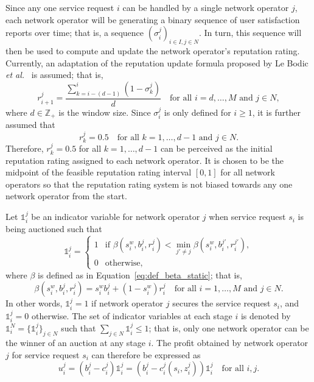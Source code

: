 Since any one service request $i$ can be handled by a single network operator $j$, each network operator will be generating a binary sequence of user satisfaction reports over time; that is, a sequence $(\sigma^j_i)_{i\in I,j\in N}$. In turn, this sequence will then be used to compute and update the network operator's reputation rating. Currently, an adaptation of the reputation update formula proposed by Le Bodic \emph{et al.}~\cite{DMLeBodic00} is assumed; that is,
\begin{equation}
  \label{eq:def_rep_update_lebodic_dynamic}
  r^j_{i+1} = \frac{\displaystyle\sum_{k=i-(d-1)}^{i}{(1-\sigma^j_k)}}{d} \quad\text{for all }i=d,\ldots,M \text{ and }j\in N,
\end{equation}
where $d\in \mathbb{Z}_+$ is the window size. Since $\sigma^j_i$ is only defined for $i\ge 1$, it is further assumed that
\begin{equation*}
  r^j_k = 0.5 \quad\text{for all }k=1,\ldots,d-1\text{ and }j\in N.
\end{equation*}
Therefore, $r^j_k=0.5$ for all $k=1,\ldots,d-1$ can be perceived as the initial reputation rating assigned to each network operator. It is chosen to be the midpoint of the feasible reputation rating interval $[0,1]$ for all network operators so that the reputation rating system is not biased towards any one network operator from the start.

Let $\mathds{1}^j_i$ be an indicator variable for network operator $j$ when service request $s_i$ is being auctioned such that
\begin{equation}
  \label{eq:indicator_function_dynamic}
  \mathds{1}^j_i = \left\{
  \begin{array}{ll}
    1 &\text{if } \beta(s^w_i,b^j_i,r^j_i) < \displaystyle\min_{j'\neq j} \beta(s^w_i,b^{j'}_i,r^{j'}_i),\\
    0 &\text{otherwise},
  \end{array}\right.
\end{equation}
where $\beta$ is defined as in Equation~\eqref{eq:def_beta_static}; that is,
\begin{equation}
  \label{eq:def_beta_dynamic}
  \beta(s^w_i,b^j_i,r^j_i) = s^w_i b^j_i + (1-s^w_i) r^j_i \quad\text{for all } i=1,\ldots,M \text{ and }j\in N.
\end{equation}
In other words, $\mathds{1}^j_i = 1$ if network operator $j$ secures the service request $s_i$, and $\mathds{1}^j_i = 0$ otherwise. The set of indicator variables at each stage $i$ is denoted by $\mathds{1}^N_i=\{\mathds{1}^j_i\}_{j\in N}$ such that $\sum_{j\in N}\mathds{1}^j_i\le 1$; that is, only one network operator can be the winner of an auction at any stage $i$. The profit obtained by network operator $j$ for service request $s_i$ can therefore be expressed as
\begin{equation}
  \label{eq:def_no_profit_dynamic}
  u^j_i = \left(b^j_i - c^j_i\right)\mathds{1}^j_i = \left(b^j_i - c^j_i(s_i, z^j_i)\right)\mathds{1}^j_i \quad\text{for all }i,j.
\end{equation}

